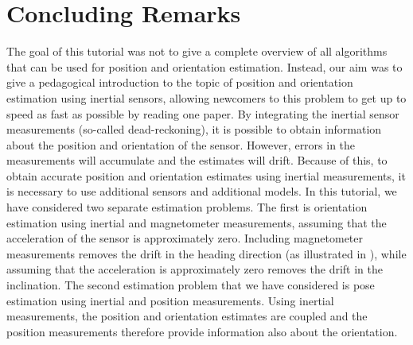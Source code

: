 \chapter{Concluding Remarks}
\label{cha:conclusions} 
The goal of this tutorial was not to give a complete overview of all algorithms that can be used for position and orientation estimation. Instead, our aim was to give a pedagogical introduction to the topic of position and orientation estimation using inertial sensors, allowing newcomers to this problem to get up to speed as fast as possible by reading one paper. By integrating the inertial sensor measurements (so-called dead-reckoning), it is possible to obtain information about the position and orientation of the sensor. However, errors in the measurements will accumulate and the estimates will drift. Because of this, to obtain accurate position and orientation estimates using inertial measurements, it is necessary to use additional sensors and additional models. In this tutorial, we have considered two separate estimation problems. The first is orientation estimation using inertial and magnetometer measurements, assuming that the acceleration of the sensor is approximately zero. Including magnetometer measurements removes the drift in the heading direction (as illustrated in ), while assuming that the acceleration is approximately zero removes the drift in the inclination. The second estimation problem that we have considered is pose estimation using inertial and position measurements. Using inertial measurements, the position and orientation estimates are coupled and the position measurements therefore provide information also about the orientation. 

